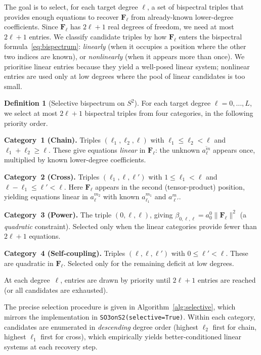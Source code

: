 \documentclass{article}
\theoremstyle{plain}
\theoremstyle{definition}
\newtheorem{definition}[theorem]{Definition}
\theoremstyle{remark}
\newcommand{\norm}[1]{\lVert #1 \rVert}
\newcommand{\conj}[1]{\overline{#1}}
\begin{document}
The goal is to select, for each target degree $\ell$, a set of
bispectral triples that provides enough equations to recover
$\mathbf{F}_\ell$ from already-known lower-degree coefficients. Since
$\mathbf{F}_\ell$ has $2\ell+1$ real degrees of freedom, we need at
most $2\ell+1$ entries. We classify candidate triples by how
$\mathbf{F}_\ell$ enters the bispectral formula~\eqref{eq:bispectrum}:
\emph{linearly} (when it occupies a position where the other two
indices are known), or \emph{nonlinearly} (when it appears more than
once). We prioritise linear entries because they yield a well-posed
linear system; nonlinear entries are used only at low degrees where
the pool of linear candidates is too small.

\begin{definition}[Selective bispectrum on $S^2$]\label{def:selective}
For each target degree $\ell = 0, \dotsc, L$, we select at most
$2\ell+1$ bispectral triples from four categories, in the following
priority order.

\medskip
\noindent\textbf{Category~1 (Chain).}
Triples $(\ell_1, \ell_2, \ell)$ with
$\ell_1 \le \ell_2 < \ell$ and $\ell_1 + \ell_2 \ge \ell$.
These give equations \emph{linear} in $\mathbf{F}_\ell$: the unknown
$\conj{a_\ell^m}$ appears once, multiplied by known lower-degree
coefficients.

\medskip
\noindent\textbf{Category~2 (Cross).}
Triples $(\ell_1, \ell, \ell')$ with
$1 \le \ell_1 < \ell$ and $\ell - \ell_1 \le \ell' < \ell$.
Here $\mathbf{F}_\ell$ appears in the second (tensor-product) position,
yielding equations linear in $a_\ell^{m_2}$ with known $a_{\ell_1}^{m_1}$
and $a_{\ell'}^{m}$.

\medskip
\noindent\textbf{Category~3 (Power).}
The triple $(0, \ell, \ell)$, giving
$\beta_{0,\ell,\ell} = a_0^0 \norm{\mathbf{F}_\ell}^2$
(a \emph{quadratic} constraint). Selected only when the linear
categories provide fewer than $2\ell+1$ equations.

\medskip
\noindent\textbf{Category~4 (Self-coupling).}
Triples $(\ell, \ell, \ell')$ with $0 \le \ell' < \ell$.
These are quadratic in $\mathbf{F}_\ell$. Selected only for the remaining deficit at low
degrees.

\medskip
\noindent
At each degree~$\ell$, entries are drawn by priority until $2\ell+1$
entries are reached (or all candidates are exhausted).
\end{definition}

The precise selection procedure is given in
Algorithm~\ref{alg:selective}, which mirrors the implementation in
\texttt{SO3onS2(selective=True)}. Within each category, candidates are
enumerated in \emph{descending} degree order (highest $\ell_2$ first
for chain, highest $\ell_1$ first for cross), which empirically yields
better-conditioned linear systems at each recovery step.
\end{document}
